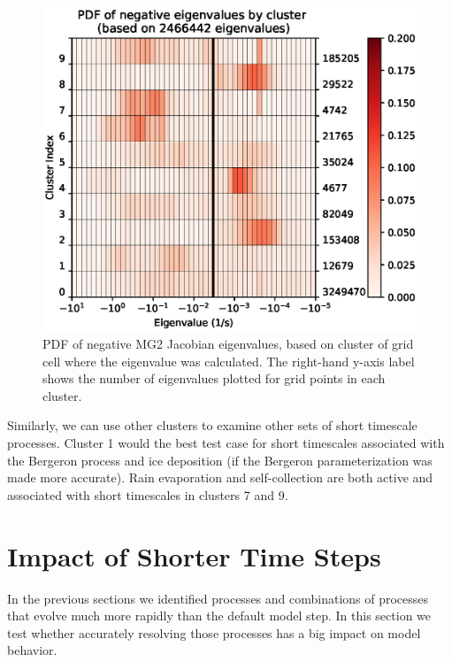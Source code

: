 \documentclass [11pt, proquest] {uwthesis}[2020/02/24]
\begin{document}
\begin{figure}[htbp]
  \includegraphics[width=6.5in]{./time_hist_cluster_2D_neg.eps}
  \caption[PDF of negative eigenvalues of the Jacobian of MG2, separated into clusters corresponding to different regimes]{PDF of negative MG2 Jacobian eigenvalues, based on cluster of grid cell where the eigenvalue was calculated. The right-hand y-axis label shows the number of eigenvalues plotted for grid points in each cluster.}
  \label{cluster-2D-neg-eig}
\end{figure}

Similarly, we can use other clusters to examine other sets of short timescale processes. Cluster 1 would the best test case for short timescales associated with the Bergeron process and ice deposition (if the Bergeron parameterization was made more accurate). Rain evaporation and self-collection are both active and associated with short timescales in clusters 7 and 9.

\section{Impact of Shorter Time Steps} \label{sec:MG2-impact}

In the previous sections we identified processes and combinations of processes that evolve much more rapidly than the default model step. In this section we test whether accurately resolving those processes has a big impact on model behavior.
\end{document}
